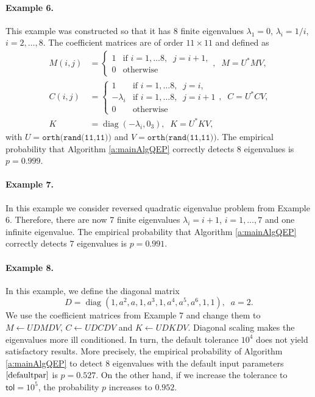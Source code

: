 \documentclass[12pt]{article}
\DeclareMathOperator{\diag}{diag}
\begin{document}
\paragraph{Example 6.}
This example was constructed so that it has 8 finite eigenvalues $\lambda_1 = 0$, $\lambda_i = 1/i$, $i=2,\ldots,8$. The coefficient matrices are of order $11\times 11$ and defined as
\begin{align*}
    M(i,j) &= \begin{cases}
    1 & \text{if } i=1,\ldots 8,\;\; j=i+1,\\
    0 & \text{otherwise}
    \end{cases},\;\;M = U^*MV,\\
    C(i,j) & = \begin{cases}
    1 & \text{if }i=1,\ldots 8, \;\;j=i,\\
    -\lambda_i & \text{if }i=1,\ldots 8, \;\;j=i+1\\
    0 & \text{otherwise}
    \end{cases},\;\; C = U^*CV,\\
    K &= \diag(-\lambda_i,0_3),\;\;K = U^*KV,
\end{align*}
with $U = \texttt{orth(rand(11,11))}$ and $V = \texttt{orth(rand(11,11))}$. The empirical probability that Algorithm \ref{a:mainAlgQEP} correctly detects $8$ eigenvalues is $p = 0.999$.
\paragraph{Example 7.}
In this example we consider reversed quadratic eigenvalue problem from Example 6. Therefore, there are now 7 finite eigenvalues $\lambda_i = i+1$, $i=1,\ldots,7$ and one infinite eigenvalue. The empirical probability that Algorithm \ref{a:mainAlgQEP} correctly detects $7$ eigenvalues is $p = 0.991$.

\paragraph{Example 8.}
In this example, we define the diagonal matrix
\begin{equation*}
    D = \diag(1,a^2,a,1,a^3,1,a^4,a^5,a^6, 1,1),\;\; a=2.
\end{equation*}
We use the coefficient matrices from Example 7 and change them to $M \gets UDMDV$, $C \gets UDCDV$ and $K \gets UDKDV$. Diagonal scaling makes the eigenvalues more ill conditioned. In turn, the default tolerance $10^4$ does not yield satisfactory results. More precisely, the empirical probability of Algorithm \ref{a:mainAlgQEP} to detect $8$ eigenvalues with the default input parameters $\eqref{defaultpar}$ is $p = 0.527$. On the other hand, if we increase the tolerance to $\mathsf{tol} = 10^5$, the probability $p$ increases to $0.952$.\\
\end{document}
